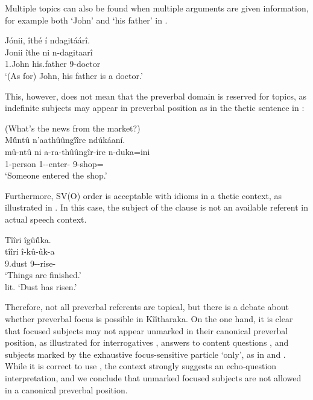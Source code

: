 \documentclass[output=paper]{langscibook}
\begin{document}
\z

Multiple topics can also be found when multiple arguments are given information, for example both `John' and `his father' in .

\ea
\label{ex:johnfatherdoctor}
Jónii, îthé í ndagitáárî.\\
\gll
Jonii  îthe  ni  n-dagitaarî\\
1.John  his.father \COP{} 9-doctor\\
\glt
‘(As for) John, his father is a doctor.’

\z

This, however, does not mean that the preverbal domain is reserved for topics, as indefinite subjects may appear in preverbal position as in the thetic sentence in :

\ea
\label{ex:marketnews}
(What’s the news from the market?)\\
M\'{û}ntû n’aathûûng\'{î}\'{î}re ndúkáaní.\\
\gll
mû-ntû  ni  a-ra-thûûngîr-ire  n-duka=ini\\
1-person \FOC{}  1\SM-\YPST{}-enter-\PFV{} 9-shop=\LOC{}\\
\glt
‘Someone entered the shop.’

\z


Furthermore, SV(O) order is acceptable with idioms in a thetic context, as illustrated in . In this case, the subject of the clause is not an available referent in actual speech context.

\ea
\label{bkm:Ref131607083}
{Tîîri îgû\'{û}ka.}\\
\gll
tîîri î-kû-ûk-a\\
9.dust 9\SM{}-\PRS{}-rise-\FV{}\\
\glt
‘Things are finished.’\\ lit. ‘Dust has risen.’

\z

Therefore, not all preverbal referents are topical, but there is a debate about whether preverbal focus is possible in Kîîtharaka. On the one hand, it is clear that focused subjects may not appear unmarked in their canonical preverbal position, as illustrated for interrogatives , answers to content questions , and subjects marked by the exhaustive focus-sensitive particle ‘only’, as in  and . While it is correct to use , the context strongly suggests an echo-question interpretation, and we conclude that unmarked focused subjects are not allowed in a canonical preverbal position.
\end{document}
